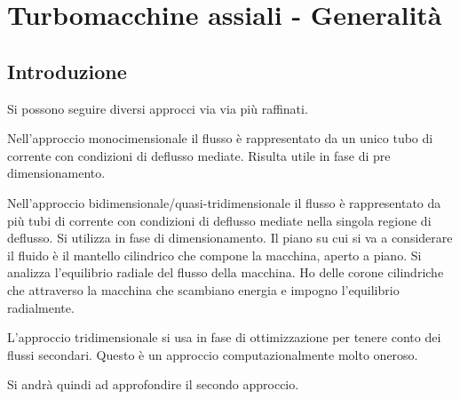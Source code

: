 \chapter{Turbomacchine assiali - Generalità}

\section{Introduzione}
Si possono seguire diversi approcci via via più raffinati.

Nell'approccio monocimensionale il flusso è rappresentato da un unico tubo di corrente con condizioni di deflusso mediate. Risulta utile in fase di pre dimensionamento. 

Nell'approccio bidimensionale/quasi-tridimensionale il flusso è rappresentato da più tubi di corrente con condizioni di deflusso mediate nella singola regione di deflusso. Si utilizza in fase di dimensionamento. Il piano su cui si va a considerare il fluido è il mantello cilindrico che compone la macchina, aperto a piano. Si analizza l'equilibrio radiale del flusso della macchina. Ho delle corone cilindriche che attraverso la macchina che scambiano energia e impogno l'equilibrio radialmente. 

L'approccio tridimensionale si usa in fase di ottimizzazione per tenere conto dei flussi secondari. Questo è un approccio computazionalmente molto oneroso.

Si andrà quindi ad approfondire il secondo approccio.

